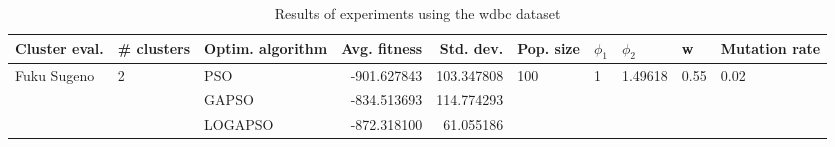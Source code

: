 \begin{table}
\centering
\caption{Results of experiments using the wdbc dataset}
\begin{tabular}{lllrrlllll}
\toprule
               Cluster eval. &        \# clusters & Optim. algorithm &  Avg. fitness &  Std. dev. &            Pop. size &         $\phi_{1}$ &               $\phi_{2}$ &                     w &         Mutation rate \\
\midrule
\multirow{3}{*}{Fuku Sugeno} & \multirow{3}{*}{2} &              PSO &   -901.627843 & 103.347808 & \multirow{3}{*}{100} & \multirow{3}{*}{1} & \multirow{3}{*}{1.49618} & \multirow{3}{*}{0.55} & \multirow{3}{*}{0.02} \\
                             &                    &            GAPSO &   -834.513693 & 114.774293 &                      &                    &                          &                       &                       \\
                             &                    &          LOGAPSO &   -872.318100 &  61.055186 &                      &                    &                          &                       &                       \\
\bottomrule
\end{tabular}
\end{table}
